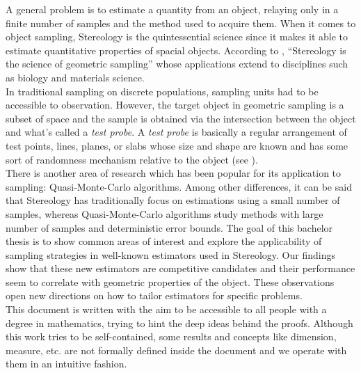 


A general problem is to estimate a quantity from an object, relaying only in a finite number of samples and the method used to acquire them.
When it comes to object sampling, Stereology is the quintessential science since it makes it able to estimate quantitative properties of spacial objects. According to \cite{CO.IAS.17.Hist.pdf}, ``Stereology is the science of geometric sampling'' whose applications extend to disciplines such as biology and materials science.\\

In traditional sampling on discrete populations, sampling units had to be accessible to observation. However, the target object in geometric sampling is a subset of space and the sample is obtained via the intersection between the object and what's called a \textit{test probe}. A \textit{test probe} is basically a regular arrangement of test points, lines, planes, or slabs whose size and shape are known and has some sort of randomness mechanism relative to the object (see \cite{CO.IAS.17.Hist.pdf}).\\

There is another area of research which has been popular for its application to sampling: Quasi-Monte-Carlo algorithms. Among other differences, it can be said that 
Stereology has traditionally focus on estimations using a small number of samples, whereas Quasi-Monte-Carlo algorithms study methods with large number of samples and deterministic error bounds. 
The goal of this bachelor thesis is to show common areas of interest and explore the applicability of sampling strategies in well-known estimators used in Stereology. Our findings show that these new estimators are competitive candidates and their performance seem to correlate with geometric properties of the object. These observations open new directions on how to tailor estimators for specific problems.\\


This document is written with the aim to be accessible to all people with a degree in mathematics, trying to hint the deep ideas behind the proofs. Although this work tries to be self-contained, some results and concepts like dimension, measure, etc. are not formally defined inside the document and we operate with them in an intuitive fashion.\\

